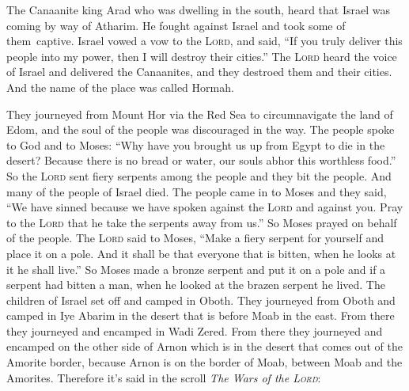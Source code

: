 
\begin{inparaenum}
     The Canaanite king Arad who was dwelling in the south, heard that Israel was coming by way of Atharim. He fought against Israel and took some of them\understood\ captive.%
     Israel vowed a vow to the \textsc{Lord}, and said, ``If you truly deliver this people into my power, then I will destroy their cities.''%
     The \textsc{Lord} heard the voice of Israel and delivered the Canaanites, and they destroed them and their cities. And the name of the place was called Hormah.%
    
     They journeyed from Mount Hor via the Red Sea to circumnavigate the land of Edom, and the soul of the people was discouraged in the way.%
     The people spoke to God and to Moses: ``Why have you brought us up from Egypt to die in the desert? Because there is no bread or water, our souls abhor this worthless food.''%
     So the \textsc{Lord} sent fiery serpents among the people and they bit the people. And many of the people of Israel died.%
     The people came in to Moses and they said, ``We have sinned because we have spoken against the \textsc{Lord} and against you. Pray to the \textsc{Lord} that he take the serpents away from us.'' So Moses prayed on behalf of the people.%
     The \textsc{Lord} said to Moses, ``Make a fiery serpent for yourself and place it on a pole. And it shall be that everyone that is bitten, when he looks at it he shall live.''%
     So Moses made a bronze serpent and put it on a pole and if a serpent had bitten a man, when he looked at the brazen serpent he lived.%
     The children of Israel set off and camped in Oboth.%
     They journeyed from Oboth and camped in Iye Abarim in the desert that is before Moab in the east.%
     From there they journeyed and encamped in Wadi Zered.%
     From there they journeyed and encamped on the other side of Arnon which is in the desert that comes out of the Amorite border, because Arnon is on the border of Moab, between Moab and the Amorites.%
     Therefore it's said in the scroll \textit{The Wars of the \textsc{Lord}}:%
    

\end{inparaenum}
